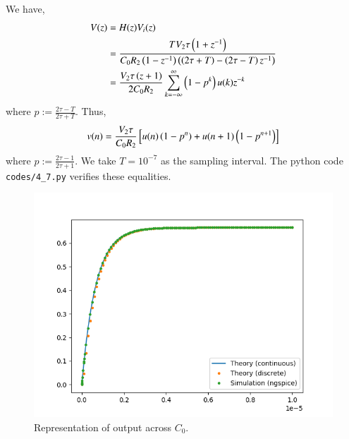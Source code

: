 \documentclass[journal,12pt,twocolumn]{IEEEtran}
\renewcommand\thesection{\arabic{section}}
\begin{document}
\begin{enumerate}[label=\arabic*.,ref=\thesection.\theenumi]
\solution We have,
\begin{align}
    V(z) &= H(z)V_i(z) \\
         &= \frac{TV_2\tau\left(1+z^{-1}\right)}{C_0R_2\left(1-z^{-1}\right)\left(\left(2\tau+T\right)-\left(2\tau-T\right)z^{-1}\right)} \\
         &= \frac{V_2\tau\left(z+1\right)}{2C_0R_2}\sum_{k=-\infty}^{\infty}\left(1-p^k\right)u(k)z^{-k}
\end{align}
where $p := \frac{2\tau-T}{2\tau+T}$. Thus,
\begin{align}
    v(n) = \frac{V_2\tau}{C_0R_2}{}\left[u(n)\left(1-p^n\right)+u(n+1)\left(1-p^{n+1}\right)\right]
\end{align}
where $p := \frac{2\tau-1}{2\tau+1}$. We take $T = 10^{-7}$ as the
sampling interval. The python code \texttt{codes/4\_7.py} verifies
these equalities.
\begin{figure}
    \includegraphics[width=\columnwidth]{figs/4_7.png}
    \caption{Representation of output across $C_0$.}
    \label{fig:vc0}
\end{figure}
\end{enumerate}
\end{document}
